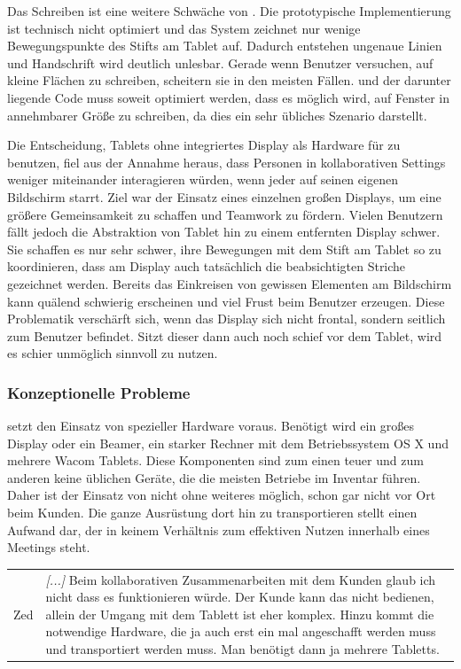 \medskip Das Schreiben ist eine weitere Schwäche von \scribbler. Die prototypische Implementierung ist technisch nicht optimiert und das System zeichnet nur wenige Bewegungspunkte des Stifts am Tablet auf. Dadurch entstehen ungenaue Linien und Handschrift wird deutlich unlesbar. Gerade wenn Benutzer versuchen, auf kleine Flächen zu schreiben, scheitern sie in den meisten Fällen. \scribbler und der darunter liegende Code muss soweit optimiert werden, dass es möglich wird, auf Fenster in annehmbarer Größe zu schreiben, da dies ein sehr übliches Szenario darstellt.

\medskip Die Entscheidung, Tablets ohne integriertes Display als Hardware für \scribbler zu benutzen, fiel aus der Annahme heraus, dass Personen in kollaborativen Settings weniger miteinander interagieren würden, wenn jeder auf seinen eigenen Bildschirm starrt. Ziel war der Einsatz eines einzelnen großen Displays, um eine größere Gemeinsamkeit zu schaffen und Teamwork zu fördern. Vielen Benutzern fällt jedoch die Abstraktion von Tablet hin zu einem entfernten Display schwer. Sie schaffen es nur sehr schwer, ihre Bewegungen mit dem Stift am Tablet so zu koordinieren, dass am Display auch tatsächlich die beabsichtigten Striche gezeichnet werden. Bereits das Einkreisen von gewissen Elementen am Bildschirm kann quälend schwierig erscheinen und viel Frust beim Benutzer erzeugen. Diese Problematik verschärft sich, wenn das Display sich nicht frontal, sondern seitlich zum Benutzer befindet. Sitzt dieser dann auch noch schief vor dem Tablet, wird es schier unmöglich \scribbler sinnvoll zu nutzen.

\subsubsection{Konzeptionelle Probleme}
\scribbler setzt den Einsatz von spezieller Hardware voraus. Benötigt wird ein großes Display oder ein Beamer, ein starker Rechner mit dem Betriebssystem OS X und mehrere Wacom Tablets. Diese Komponenten sind zum einen teuer und zum anderen keine üblichen Geräte, die die meisten Betriebe im Inventar führen. Daher ist der Einsatz von \scribbler nicht ohne weiteres möglich, schon gar nicht vor Ort beim Kunden. Die ganze Ausrüstung dort hin zu transportieren stellt einen Aufwand dar, der in keinem Verhältnis zum effektiven Nutzen innerhalb eines Meetings steht.

\begin{extract}[Notwendige Hardware schränkt ein.]
	{
		\myfloatalign
		\begin{tabularx}{\textwidth}{p{1cm}X}
			Zed & \emph{[...]} Beim kollaborativen Zusammenarbeiten mit dem Kunden glaub ich nicht dass es funktionieren würde. Der Kunde kann das nicht bedienen, allein der Umgang mit dem Tablett ist eher komplex. Hinzu kommt die notwendige Hardware, die ja auch erst ein mal angeschafft werden muss und transportiert werden muss. Man benötigt dann ja mehrere Tabletts. 
		\end{tabularx}
	}
\end{extract}

